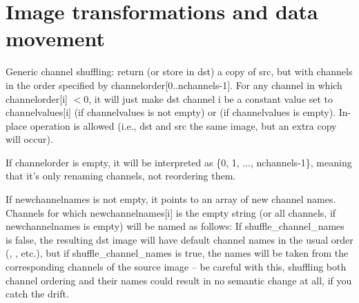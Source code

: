 \newpage

\section{Image transformations and data movement}
\label{sec:iba:transforms}

  \label{sec:iba:channels}

Generic channel shuffling: return (or store in {\cf dst}) a copy of
{\cf src}, but with channels in the order specified by
{\cf channelorder[0..nchannels-1]}. For any channel in which
{\cf channelorder[i]} $< 0$, it will just make {\cf dst} channel {\cf i} be
a constant value set to {\cf channelvalues[i]} (if {\cf channelvalues} is
not empty) or {} (if {\cf channelvalues} is empty). In-place
operation is allowed (i.e., dst and src the same image, but an extra copy
will occur).

If {\cf channelorder} is empty, it will be interpreted as
{\cf \{0, 1, ..., nchannels-1\}}, meaning that it's only renaming channels,
not reordering them.

If {\cf newchannelnames} is not empty, it points to an array of new channel
names.  Channels for which {\cf newchannelnames[i]} is the empty string (or
all channels, if {\cf newchannelnames} is empty) will be named as follows:
If {\cf shuffle_channel_names} is {\cf false}, the resulting dst image will have
default channel names in the usual order (, , etc.), but if
{\cf shuffle_channel_names} is {\cf true}, the names will be taken from the
corresponding channels of the source image -- be careful with this,
shuffling both channel ordering and their names could result in no
semantic change at all, if you catch the drift.

